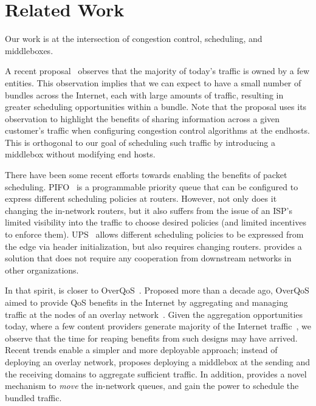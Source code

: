 \section{Related Work}
\label{s:related}

Our work is at the intersection of congestion control, scheduling, and middleboxes. 

 A recent proposal~\cite{fivecomps} observes that the majority of today's traffic is owned by a few entities.
This observation implies that we can expect to have a small number of bundles across the Internet, each with large amounts of traffic, resulting in greater scheduling opportunities within a bundle. Note that the proposal uses its observation to highlight the benefits of sharing information across a given customer's traffic when configuring congestion control algorithms at the endhosts. This is orthogonal to our goal of scheduling such traffic by introducing a middlebox without modifying end hosts.


 There have been some recent efforts towards enabling the benefits of packet scheduling. PIFO~\cite{pifo} is a programmable priority queue that can be configured to express different scheduling policies at routers. However, not only does it changing the in-network routers, but it also suffers from the issue of an ISP's limited visibility into the traffic to choose desired policies (and limited incentives to enforce them). UPS~\cite{ups} allows different scheduling policies to be expressed from the edge via header initialization, but also requires changing routers.
\name provides a solution that does not require any cooperation from downstream networks in other organizations.

In that spirit, \name is closer to OverQoS~\cite{overqos}. Proposed more than a decade ago, OverQoS aimed to provide QoS benefits in the Internet by aggregating and managing traffic at the nodes of an overlay network~\cite{ron}. Given the aggregation opportunities today, where a few content providers generate majority of the Internet traffic~\cite{fivecomps}, we observe that the time for reaping benefits from such designs may have arrived. Recent trends enable a simpler and more deployable approach; instead of deploying an overlay network, \name{} proposes deploying a middlebox at the sending and the receiving domains to aggregate sufficient traffic. In addition, \name provides a novel mechanism to \emph{move} the in-network queues, and gain the power to schedule the bundled traffic. 


